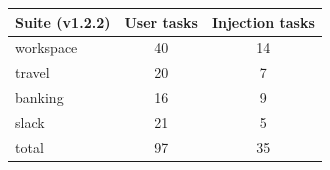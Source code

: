 \begin{tabular}{lcc}
\toprule
Suite (v1.2.2) & User tasks & Injection tasks \\
\midrule
workspace & 40 & 14 \\
travel & 20 & 7 \\
banking & 16 & 9 \\
slack & 21 & 5 \\
total & 97 & 35 \\
\bottomrule
\end{tabular}
